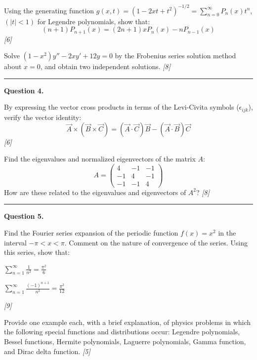 \documentclass[11pt,a4paper]{article}
\newcommand{\pts}[1]{\hfill   \textit{[#1]}}
\begin{document}
\begin{parts}
  \item Using the generating function $g(x,t) = (1-2xt+t^2)^{-1/2} = \sum_{n=0}^{\infty} P_n(x)t^n$, $(|t| < 1)$ for Legendre polynomials, show that:
    \[ (n+1)P_{n+1}(x) = (2n+1)x P_n(x) - n P_{n-1}(x) \] \pts{6}
  \item Solve $(1-x^2)y'' - 2xy' + 12y = 0$ by the Frobenius series solution method about $x=0$, and obtain two independent solutions. \pts{8}
\end{parts}

\medskip\rule{\linewidth}{0.2pt}




\noindent   \textbf{Question 4.}

\begin{parts}
  \item By expressing the vector cross products in terms of the Levi-Civita symbols ($\epsilon_{ijk}$), verify the vector identity:
    \[ \vec{A}  \times (\vec{B}  \times \vec{C}) = (\vec{A} \cdot \vec{C})\vec{B} - (\vec{A} \cdot \vec{B})\vec{C} \] \pts{6}
  \item Find the eigenvalues and normalized eigenvectors of the matrix $A$:
    \[ A = 
\begin{pmatrix} 4 & -1 & -1 \\ -1 & 4 & -1 \\ -1 & -1 & 4 \end{pmatrix} \]
    How are these related to the eigenvalues and eigenvectors of $A^2$? \pts{8}
\end{parts}

\medskip\rule{\linewidth}{0.2pt}




\noindent   \textbf{Question 5.}

\begin{parts}
  \item Find the Fourier series expansion of the periodic function $f(x) = x^2$ in the interval $-\pi < x < \pi$. Comment on the nature of convergence of the series. Using this series, show that:
    
\begin{parts}
      \item $\sum_{n=1}^{\infty} \frac{1}{n^2} = \frac{\pi^2}{6}$
      \item $\sum_{n=1}^{\infty} \frac{(-1)^{n+1}}{n^2} = \frac{\pi^2}{12}$
    \end{parts} \pts{9}
  \item Provide one example each, with a brief explanation, of physics problems in which the following special functions and distributions occur: Legendre polynomials, Bessel functions, Hermite polynomials, Laguerre polynomials, Gamma function, and Dirac delta function. \pts{5}
\end{parts}
\end{document}
